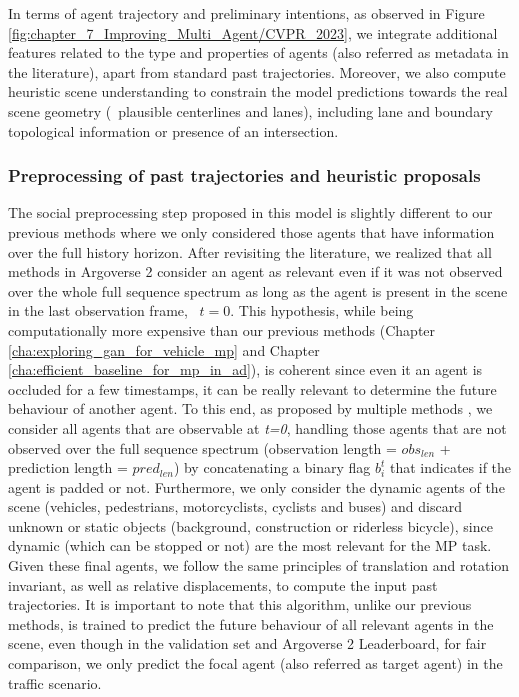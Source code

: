In terms of agent trajectory and preliminary intentions, as observed in Figure \ref{fig:chapter_7_Improving_Multi_Agent/CVPR_2023}, we integrate additional features related to the type and properties of agents (also referred as metadata in the literature), apart from standard past trajectories. Moreover, we also compute heuristic scene understanding to constrain the model predictions towards the real scene geometry (\eg \ plausible centerlines and lanes), including lane and boundary topological information or presence of an intersection. 

\subsubsection{Preprocessing of past trajectories and heuristic proposals}
\label{subsubsec:7_improving_efficiency_preprocessing}

The social preprocessing step proposed in this model is slightly different to our previous methods where we only considered those agents that have information over the full history horizon. After revisiting the literature, we realized that all methods in Argoverse 2 consider an agent as relevant even if it was not observed over the whole full sequence spectrum as long as the agent is present in the scene in the last observation frame, \ie \ $t=0$. This hypothesis, while being computationally more expensive than our previous methods (Chapter \ref{cha:exploring_gan_for_vehicle_mp} and Chapter \ref{cha:efficient_baseline_for_mp_in_ad}), is coherent since even it an agent is occluded for a few timestamps, it can be really relevant to determine the future behaviour of another agent. To this end, as proposed by multiple methods \cite{liang2020learning, schmidt2022crat}, we consider all agents that are observable at \textit{t=0}, handling those agents that are not observed over the full sequence spectrum (observation length = \textit{$obs_{len}$} + prediction length = \textit{$pred_{len}$}) by concatenating a binary flag $b_i^t$ that indicates if the agent is padded or not. Furthermore, we only consider the dynamic agents of the scene (vehicles, pedestrians, motorcyclists, cyclists and buses) and discard unknown or static objects (background, construction or riderless bicycle), since dynamic (which can be stopped or not) are the most relevant for the \ac{MP} task. Given these final agents, we follow the same principles of translation and rotation invariant, as well as relative displacements, to compute the input past trajectories. It is important to note that this algorithm, unlike our previous methods, is trained to predict the future behaviour of all relevant agents in the scene, even though in the validation set and Argoverse 2 Leaderboard, for fair comparison, we only predict the focal agent (also referred as target agent) in the traffic scenario. 

